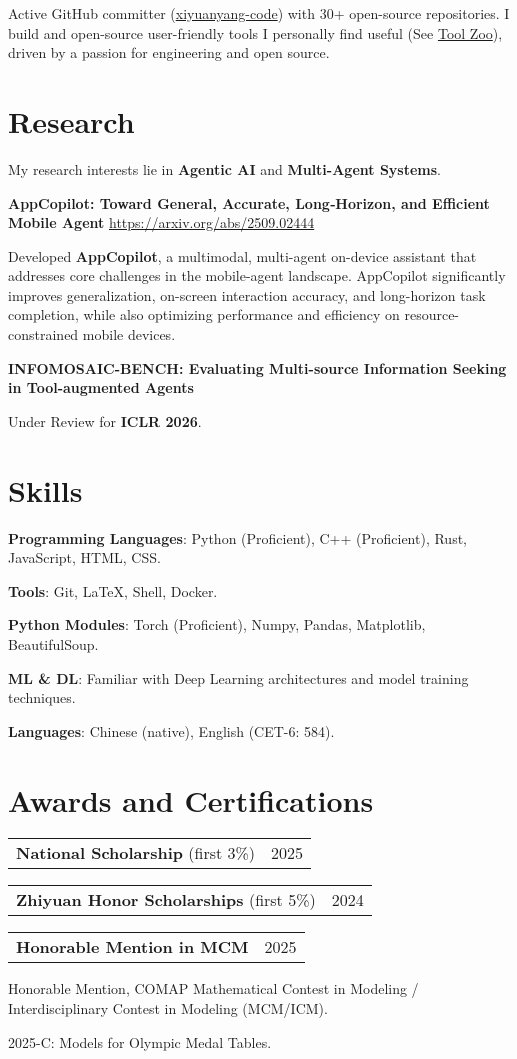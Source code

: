 \documentclass[letterpaper,11pt]{article}
\makeatletter
\newcommand{\twopartheader}[2]{
  \vspace{-2pt}\noindent
  \begin{tabular*}{\textwidth}{l@{\extracolsep{\fill}}r}
    #1 & #2 \\
  \end{tabular*}\vspace{-7pt}
}
\makeatother
\begin{document}
Active GitHub committer (\href{https://github.com/xiyuanyang-code}{xiyuanyang-code}) with 30+ open-source repositories. I build and open-source user-friendly tools I personally find useful (See \href{https://xiyuanyang-code.github.io/Tool-Zoo/}{Tool Zoo}), driven by a passion for engineering and open source.


\section{Research}

My research interests lie in \textbf{Agentic AI} and  \textbf{Multi-Agent Systems}.
\newline

\textbf{AppCopilot: Toward General, Accurate, Long‑Horizon, and Efficient Mobile Agent}
\url{https://arxiv.org/abs/2509.02444}

Developed \textbf{AppCopilot}, a multimodal, multi-agent on-device assistant that addresses core challenges in the mobile-agent landscape. AppCopilot significantly improves generalization, on-screen interaction accuracy, and long-horizon task completion, while also optimizing performance and efficiency on resource-constrained mobile devices.
\newline


\textbf{INFOMOSAIC-BENCH: Evaluating Multi-source Information Seeking in Tool-augmented Agents}

Under Review for \textbf{ICLR 2026}.

\section{Skills}
\textbf{Programming Languages}: Python (Proficient), C++ (Proficient), Rust, JavaScript, HTML, CSS.

\textbf{Tools}: Git, LaTeX, Shell, Docker.

\textbf{Python Modules}: Torch (Proficient), Numpy, Pandas, Matplotlib, BeautifulSoup.

\textbf{ML \& DL}: Familiar with Deep Learning architectures and model training techniques.

\textbf{Languages}: Chinese (native), English (CET-6: 584).




\section{Awards and Certifications}

\twopartheader{\textbf{National Scholarship} (first 3\%)}{2025}
\newline

\twopartheader{\textbf{Zhiyuan Honor Scholarships} (first 5\%)}{2024}
\newline

\twopartheader{\textbf{Honorable Mention in MCM}}{2025}

Honorable Mention, COMAP Mathematical Contest in Modeling / Interdisciplinary Contest in Modeling (MCM/ICM).

2025-C: Models for Olympic Medal Tables.
\end{document}
